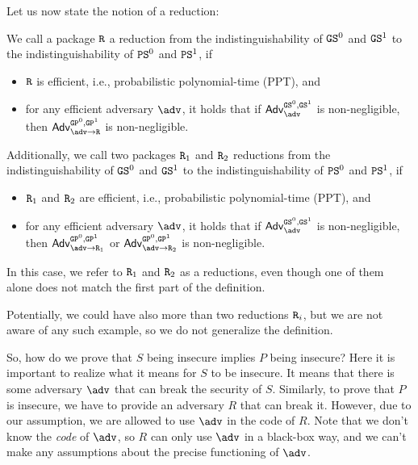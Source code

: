 Let us now state the notion of a reduction:
\begin{definition}[Reduction]
      We call a package $\text{\texttt{R}}$ a reduction from the indistinguishability of $\text{\texttt{GS}}^0$ and  $\text{\texttt{GS}}^1$ to the indistinguishability of
      $\text{\texttt{PS}}^0$ and  $\text{\texttt{PS}}^1$, if
      \begin{itemize}
            \item $\text{\texttt{R}}$ is efficient, i.e., probabilistic polynomial-time (PPT), and
            \item for any efficient adversary $\adv$, it holds that if $\mathsf{Adv}^{\M{GS}^0,\M{GS}^1}_\adv$ is non-negligible, then
                  $\mathsf{Adv}^{\M{GP}^0,\M{GP}^1}_{\adv\rightarrow\M{R}}$ is non-negligible.
      \end{itemize}
      Additionally, we call two packages $\text{\texttt{R}}_1$ and $\text{\texttt{R}}_2$ reductions from the indistinguishability of $\text{\texttt{GS}}^0$ and  $\text{\texttt{GS}}^1$ to the indistinguishability of
      $\text{\texttt{PS}}^0$ and  $\text{\texttt{PS}}^1$, if
      \begin{itemize}
            \item $\text{\texttt{R}}_1$ and $\text{\texttt{R}}_2$ are efficient, i.e., probabilistic polynomial-time (PPT), and
            \item for any efficient adversary $\adv$, it holds that if $\mathsf{Adv}^{\M{GS}^0,\M{GS}^1}_\adv$ is non-negligible, then
                  $\mathsf{Adv}^{\M{GP}^0,\M{GP}^1}_{\adv\rightarrow\M{R}_1}$ or $\mathsf{Adv}^{\M{GP}^0,\M{GP}^1}_{\adv\rightarrow\M{R}_2}$ is non-negligible.
      \end{itemize}
      In this case, we refer to $\text{\texttt{R}}_1$ and $\text{\texttt{R}}_2$ as a reductions, even though one of them alone does not match the first
      part of the definition.
\end{definition}
Potentially, we could have also more than two reductions $\text{\texttt{R}}_i$, but we are not aware of any such example,
so we do not generalize the definition.


\iffalse
      So, how do we prove that $S$ being insecure implies $P$ being insecure? Here it is important to realize what it means for $S$ to be insecure. It means that there is some adversary $\adv$ that can break the security of $S$. Similarly, to prove that $P$ is insecure, we have to provide an adversary $R$ that can break it. However, due to our assumption, we are allowed to use $\adv$ in the code of $R$. Note that we don't know the \emph{code} of $\adv$, so $R$ can only use $\adv$ in a black-box way, and we can't make any assumptions about the precise functioning of $\adv$.

